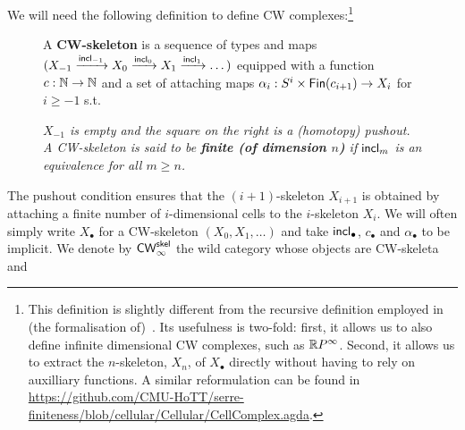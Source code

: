 \documentclass[a4page]{article}
\begin{document}
We will need the following definition to define CW complexes:\footnote{This definition is slightly different from the
  recursive definition employed in (the formalisation
  of)~\cite{BuchholtzFavonia18}. Its usefulness is two-fold: first, it
  allows us to also define infinite dimensional CW complexes, such as
  $\textnormal{\ensuremath{\mathbb{R}P^\infty}}$. Second, it allows us to extract the $n$-skeleton,
  $X_n$, of $X_{\bullet}$ directly without having to rely on
  auxilliary functions. A similar reformulation can be found in \url{https://github.com/CMU-HoTT/serre-finiteness/blob/cellular/Cellular/CellComplex.agda}.}
%
\begin{figure}[H]
\begin{minipage}{0.68 \linewidth}
\begin{definition}
  A \textbf{CW-skeleton} is a sequence of types and maps
  $(X_{-1} \xrightarrow{\textnormal{\ensuremath{\mathsf{incl}_{-1}}}} X_0 \xrightarrow{\textnormal{\ensuremath{\mathsf{incl}_{0}}}} X_1 \xrightarrow{\textnormal{\ensuremath{\mathsf{incl}_{1}}}} \dots )$
  equipped with a function $c : \textsf{$\mathbb{N}$} \to \textsf{$\mathbb{N}$}$ and a set of attaching maps $\alpha_i : S^i \times \textnormal{\ensuremath{\mathsf{Fin}({c_{i+1}})}} \to X_i$ for $i \geq -1$ s.t.
\end{definition}
\end{minipage}
\vspace{-.1cm}
\begin{minipage}{0.32 \linewidth}
\end{minipage}
\emph{$X_{-1}$ is empty and the square on the right is a (homotopy) pushout. A CW-skeleton is said to be \textbf{finite (of dimension $n$)} if $\textnormal{\ensuremath{\mathsf{incl}_{m}}}$ is
an equivalence for all $m \geq n$.}
\end{figure}
%
The pushout condition ensures that the \( (i+1) \)-skeleton \( X_{i+1} \) is
obtained by attaching a finite number of \( i \)-dimensional cells to the
\( i \)-skeleton \( X_i \).
%
We will often simply write $X_\bullet$ for a CW-skeleton $(X_0,X_1,\dots)$ and
take $\textnormal{\ensuremath{\mathsf{incl}_{\bullet}}}$, $c_{\bullet}$ and $ \alpha_{\bullet}$ to be implicit.
%
We denote by $\textnormal{\ensuremath{\mathsf{CW}_\infty^{\mathsf{skel}}}}$ the wild category whose objects are CW-skeleta and
\end{document}
